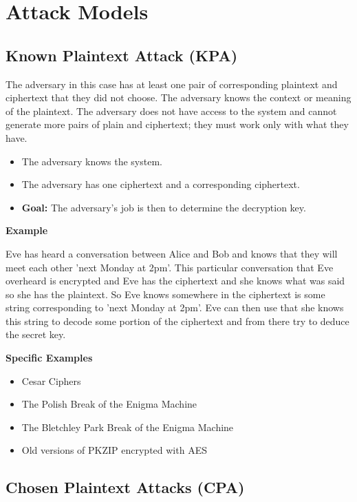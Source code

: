 \section{Attack Models}

\subsection{Known Plaintext Attack (KPA)}

The adversary in this case has at least one pair of corresponding plaintext and ciphertext that they did not choose.
The adversary knows the context or meaning of the plaintext.
The adversary does not have access to the system and cannot generate more pairs of plain and ciphertext; they must work only with what they have.


\begin{itemize}
\item The adversary knows the system.
\item The adversary has one ciphertext and a corresponding ciphertext.
\item \textbf{Goal:} The adversary’s job is then to determine the decryption key.
\end{itemize}


\textbf{Example}


Eve has heard a conversation between Alice and Bob and knows that they will meet each other 'next Monday at 2pm'.
This particular conversation that Eve overheard is encrypted and Eve has the ciphertext and she knows what was said so she has the plaintext. 
So Eve knows somewhere in the ciphertext is some string corresponding to 'next Monday at 2pm'. 
Eve can then use that she knows this string to decode some portion of the ciphertext and from there try to deduce the secret key. 


\textbf{Specific Examples}


\begin{itemize}
\item Cesar Ciphers
\item The Polish Break of the Enigma Machine
\item The Bletchley Park Break of the Enigma Machine
\item Old versions of PKZIP encrypted with AES
\end{itemize}



\subsection{Chosen Plaintext Attacks (CPA)}


